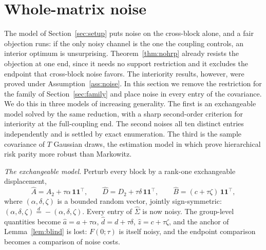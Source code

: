 \documentclass[11pt]{article}
\theoremstyle{remark}
\begin{document}
\section{Whole-matrix noise}
\label{sec:whole}

The model of Section~\ref{sec:setup} puts noise on the cross-block alone,
and a fair objection runs: if the only noisy channel is the one the
coupling controls, an interior optimum is unsurprising.
Theorem~\ref{thm:nohrp} already resists the objection at one end, since it
needs no support restriction and it excludes the endpoint that cross-block
noise favors. The interiority results, however, were proved under
Assumption~\ref{ass:noise}. In this section we remove the restriction for
the family of Section~\ref{sec:family} and place noise in every entry of
the covariance. We do this in three models of increasing generality. The
first is an exchangeable model solved by the same reduction, with a
sharp second-order criterion for interiority at the full-coupling end.
The second noises all ten distinct
entries independently and is settled by exact enumeration. The third is
the sample covariance of $T$ Gaussian draws, the estimation model in
which \cite{antonov2025} prove hierarchical risk parity more robust than
Markowitz.

\emph{The exchangeable model.} Perturb every block by a rank-one
exchangeable displacement,
\begin{equation}
  \widehat A = A_2 + \tau\alpha\,\mathbf{1}\mathbf{1}^\top, \qquad
  \widehat D = D_2 + \tau\delta\,\mathbf{1}\mathbf{1}^\top, \qquad
  \widehat B = (c + \tau\zeta)\,\mathbf{1}\mathbf{1}^\top,
  \label{eq:wholemodel}
\end{equation}
where $(\alpha, \delta, \zeta)$ is a bounded random vector, jointly
sign-symmetric: $(\alpha,\delta,\zeta) \overset{d}{=}
-(\alpha,\delta,\zeta)$. Every entry of $\widehat\Sigma$ is now noisy. The
group-level quantities become $\hat a = a + \tau\alpha$,
$\hat d = d + \tau\delta$, $\hat z = c + \tau\zeta$, and the anchor of
Lemma~\ref{lem:blind} is lost: $F(0;\tau)$ is itself noisy, and the
endpoint comparison becomes a comparison of noise costs.
\end{document}

